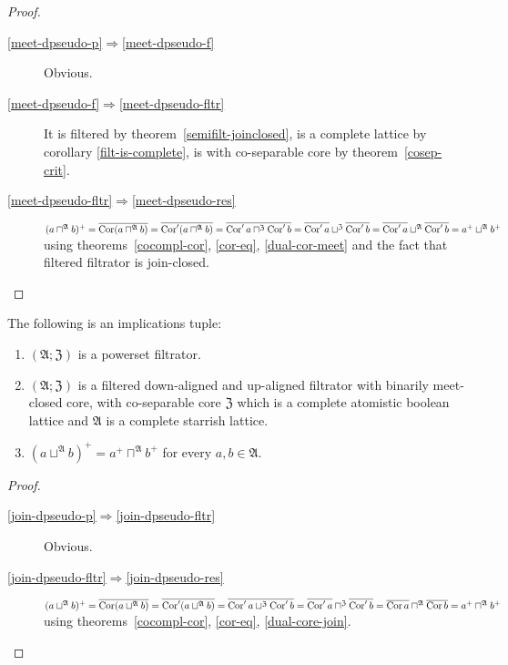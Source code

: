 \begin{proof}
~
\begin{description}
\item [\ref{meet-dpseudo-p}$\Rightarrow$\ref{meet-dpseudo-f}] Obvious.
\item [\ref{meet-dpseudo-f}$\Rightarrow$\ref{meet-dpseudo-fltr}]
It is filtered by theorem~\ref{semifilt-joinclosed},
is a complete lattice by corollary \ref{filt-is-complete},
is with co-separable core by theorem~\ref{cosep-crit}.
\item [\ref{meet-dpseudo-fltr}$\Rightarrow$\ref{meet-dpseudo-res}]
$(a\sqcap^{\mathfrak{A}}b)^{+}=
\overline{\operatorname{Cor}(a\sqcap^{\mathfrak{A}}b)} =
\overline{\operatorname{Cor}'(a\sqcap^{\mathfrak{A}}b)} =
\overline{\operatorname{Cor}' a\sqcap^{\mathfrak{Z}}\operatorname{Cor}' b} =
\overline{\operatorname{Cor}'a}\sqcup^{\mathfrak{Z}}\overline{\operatorname{Cor}'b}=
\overline{\operatorname{Cor}'a}\sqcup^{\mathfrak{A}}\overline{\operatorname{Cor}'b}=
a^{+}\sqcup^{\mathfrak{A}}b^{+}$
using theorems~\ref{cocompl-cor}, \ref{cor-eq}, \ref{dual-cor-meet} and the fact that filtered filtrator is join-closed.
\end{description}
\end{proof}

\begin{thm}
The following is an implications tuple:
\begin{enumerate}
\item \label{join-dpseudo-p}$(\mathfrak{A};\mathfrak{Z})$ is a powerset filtrator.
\item \label{join-dpseudo-fltr} $(\mathfrak{A};\mathfrak{Z})$ is a filtered
down-aligned and up-aligned filtrator with binarily meet-closed core, with co-separable core $\mathfrak{Z}$
which is a complete atomistic boolean lattice and $\mathfrak{A}$ is a complete
starrish lattice.
\item \label{join-dpseudo-res}$(a\sqcup^{\mathfrak{A}}b)^{+}=a^{+}\sqcap^{\mathfrak{A}}b^{+}$
for every $a,b\in\mathfrak{A}$.
\end{enumerate}
\end{thm}

\begin{proof}
~
\begin{description}
\item [\ref{join-dpseudo-p}$\Rightarrow$\ref{join-dpseudo-fltr}] Obvious.
\item [\ref{join-dpseudo-fltr}$\Rightarrow$\ref{join-dpseudo-res}]
$(a\sqcup^{\mathfrak{A}}b)^{+}=
\overline{\operatorname{Cor}(a\sqcup^{\mathfrak{A}}b)} =
\overline{\operatorname{Cor}'(a\sqcup^{\mathfrak{A}}b)} =
\overline{\operatorname{Cor}'a\sqcup^{\mathfrak{Z}}\operatorname{Cor}'b} =
\overline{\operatorname{Cor}'a}\sqcap^{\mathfrak{Z}}\overline{\operatorname{Cor}'b} =
\overline{\operatorname{Cor} a}\sqcap^{\mathfrak{A}}\overline{\operatorname{Cor} b} =
a^{+}\sqcap^{\mathfrak{A}}b^{+}$
using theorems~\ref{cocompl-cor}, \ref{cor-eq}, \ref{dual-core-join}.
\end{description}
\end{proof}

